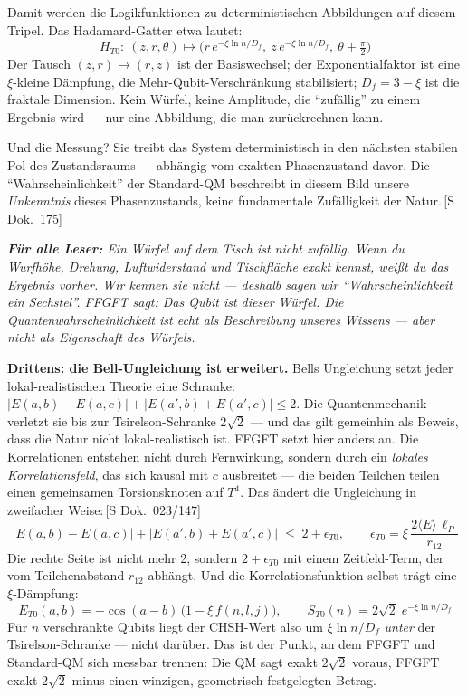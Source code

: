 \documentclass[11pt,oneside]{book}
\newcommand{\status}[1]{\penalty10000\,{\scriptsize\textcolor{gray!60}{[#1]}}}
\newenvironment{laierspur}{%
  \par\vspace{4pt}%
  \noindent\small\itshape\color{blue!60!black}%
  \textbf{Für alle Leser:}\enspace\ignorespaces}{%
  \par\vspace{4pt}\normalsize\normalfont\normalcolor}
\begin{document}
Damit werden die Logikfunktionen zu deterministischen Abbildungen auf
diesem Tripel. Das Hadamard-Gatter etwa lautet:
\[
  H_{T0}:\ (z, r, \theta) \longmapsto
  \bigl(r\,e^{-\xi\ln n/D_f},\ z\,e^{-\xi\ln n/D_f},\ \theta + \tfrac{\pi}{2}\bigr)
\]
Der Tausch $(z,r)\to(r,z)$ ist der Basiswechsel; der Exponentialfaktor
ist eine $\xi$-kleine Dämpfung, die Mehr-Qubit-Verschränkung stabilisiert;
$D_f = 3-\xi$ ist die fraktale Dimension. Kein Würfel, keine Amplitude,
die \enquote{zufällig} zu einem Ergebnis wird --- nur eine Abbildung, die man
zurückrechnen kann.

Und die Messung? Sie treibt das System deterministisch in den nächsten
stabilen Pol des Zustandsraums --- abhängig vom exakten Phasenzustand
davor. Die \enquote{Wahrscheinlichkeit} der Standard-QM beschreibt in diesem
Bild unsere \textit{Unkenntnis} dieses Phasenzustands, keine
fundamentale Zufälligkeit der Natur.\status{S Dok.~175}

\begin{laierspur}
Ein Würfel auf dem Tisch ist nicht zufällig. Wenn du Wurfhöhe, Drehung,
Luftwiderstand und Tischfläche exakt kennst, weißt du das Ergebnis vorher.
Wir kennen sie nicht --- deshalb sagen wir \enquote{Wahrscheinlichkeit ein Sechstel}.
FFGFT sagt: Das Qubit ist dieser Würfel. Die Quantenwahrscheinlichkeit
ist echt als Beschreibung unseres Wissens --- aber nicht als Eigenschaft
des Würfels.
\end{laierspur}

\textbf{Drittens: die Bell-Ungleichung ist erweitert.}
Bells Ungleichung setzt jeder lokal-realistischen Theorie eine Schranke:
$|E(a,b)-E(a,c)| + |E(a',b)+E(a',c)| \leq 2$. Die Quantenmechanik
verletzt sie bis zur Tsirelson-Schranke $2\sqrt{2}$ --- und das gilt
gemeinhin als Beweis, dass die Natur nicht lokal-realistisch ist. FFGFT
setzt hier anders an. Die Korrelationen entstehen nicht durch
Fernwirkung, sondern durch ein \textit{lokales Korrelationsfeld}, das
sich kausal mit $c$ ausbreitet --- die beiden Teilchen teilen einen
gemeinsamen Torsionsknoten auf $T^4$. Das ändert die Ungleichung in
zweifacher Weise:\status{S Dok.~023/147}
\[
  |E(a,b)-E(a,c)| + |E(a',b)+E(a',c)| \;\leq\; 2 + \epsilon_{T0},
  \qquad
  \epsilon_{T0} = \xi\,\frac{2\langle E\rangle\,\ell_P}{r_{12}}
\]
Die rechte Seite ist nicht mehr 2, sondern $2+\epsilon_{T0}$ mit einem
Zeitfeld-Term, der vom Teilchenabstand $r_{12}$ abhängt. Und die
Korrelationsfunktion selbst trägt eine $\xi$-Dämpfung:
\[
  E_{T0}(a,b) = -\cos(a-b)\,\bigl(1 - \xi\,f(n,l,j)\bigr),
  \qquad
  S_{T0}(n) = 2\sqrt{2}\;e^{-\xi\ln n/D_f}
\]
Für $n$ verschränkte Qubits liegt der CHSH-Wert also um $\xi\ln n/D_f$
\textit{unter} der Tsirelson-Schranke --- nicht darüber. Das ist der
Punkt, an dem FFGFT und Standard-QM sich messbar trennen: Die QM sagt
exakt $2\sqrt{2}$ voraus, FFGFT exakt $2\sqrt{2}$ minus einen winzigen,
geometrisch festgelegten Betrag.
\end{document}
